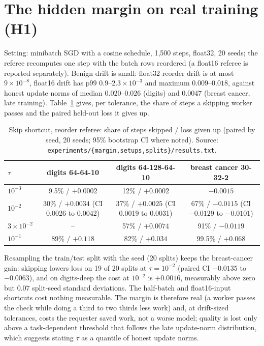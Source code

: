 \documentclass[sigconf,anonymous]{acmart}
\begin{document}
\section{The hidden margin on real training (H1)}\label{sec:margin}
Setting: minibatch SGD with a cosine schedule, 1,500 steps, float32, 20 seeds; the referee recomputes one step with
the batch rows reordered (a float16 referee is reported separately). Benign drift is small: float32 reorder drift is at
most $9\times10^{-8}$, float16 drift has p99 $0.9$--$2.3\times10^{-3}$ and maximum $0.009$--$0.018$, against honest
update norms of median $0.020$--$0.026$ (digits) and $0.0047$ (breast cancer, late training). Table~\ref{tab:margin} gives, per
tolerance, the share of steps a skipping worker passes and the paired held-out loss it gives up.
\begin{table}[t]\caption{Skip shortcut, reorder referee: share of steps skipped / loss given up (paired by seed,
20 seeds; 95\% bootstrap CI where noted). Source: \texttt{experiments/\{margin,setups,splits\}/results.txt}.}
\label{tab:margin}\small
\begin{tabular}{lccc}
$\tau$ & digits 64-64-10 & digits 64-128-64-10 & breast cancer 30-32-2\\\hline
$10^{-3}$ & 9.5\% / $+0.0002$ & 12\% / $+0.0002$ & $-0.0015$\\
$10^{-2}$ & 30\% / $+0.0034$ (CI 0.0026 to 0.0042) & 37\% / $+0.0025$ (CI 0.0019 to 0.0031) & 67\% / $-0.0115$ (CI $-0.0129$ to $-0.0101$)\\
$3\times10^{-2}$ & -- & 57\% / $+0.0074$ & 91\% / $-0.0119$\\
$10^{-1}$ & 89\% / $+0.118$ & 82\% / $+0.034$ & 99.5\% / $+0.068$\\
\end{tabular}\end{table}
Resampling the train/test split with the seed (20 splits) keeps the breast-cancer gain: skipping lowers loss on 19 of 20
splits at $\tau=10^{-2}$ (paired CI $-0.0135$ to $-0.0063$), and on digits-deep the cost at $10^{-2}$ is $+0.0016$, measurably
above zero but $0.07$ split-seed standard deviations. The half-batch and float16-input shortcuts cost nothing
measurable. The margin is therefore real (a worker passes the check while doing a third to two thirds less work) and,
at drift-sized tolerances, costs the requester saved work, not a worse model; quality is lost only above a
task-dependent threshold that follows the late update-norm distribution, which suggests stating $\tau$ as a quantile of
honest update norms.
\end{document}
